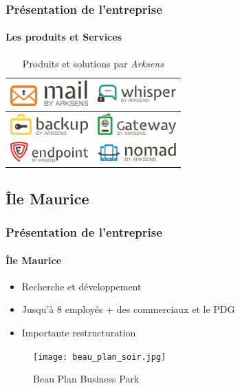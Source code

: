 \documentclass{beamer}
\begin{document}
\begin{frame}
  \frametitle{Pr\'esentation de l'entreprise}
  \framesubtitle{Les produits et Services}
  \begin{table}[h!]
    \centering
    \def\arraystretch{1.5}
    \setlength{\fboxsep}{13pt} %
    \setlength{\fboxrule}{0pt} %
    \begin{tabular}{cc}
      \arrayrulecolor{gray73}
      \includegraphics[width=3cm, fbox]{produits/mail.png} & 
      \includegraphics[width=3cm, fbox]{produits/whisper.png}\\
      \hline
      \includegraphics[width=3cm, fbox]{produits/backup.png} &
      \includegraphics[width=3cm, fbox]{produits/gateway.png}\\
      \hline
      \includegraphics[width=3cm, fbox]{produits/endpoint.png} &
      \includegraphics[width=3cm, fbox]{produits/nomad.png}\\
    \end{tabular}
    \caption{Produits et solutions par \textit{Arksens}}
  \end{table}
\end{frame}

\subsection{\^Ile Maurice}
\begin{frame}
  \frametitle{Pr\'esentation de l'entreprise}
  \framesubtitle{\^Ile Maurice}
  \begin{minipage}{0.49\linewidth}
    \begin{itemize}
     \item Recherche et d\'eveloppement
     \item Jusqu'\`a 8 employ\'es + des commerciaux et le PDG
     \item Importante restructuration
    \end{itemize}
  \end{minipage}
  \begin{minipage}{0.49\linewidth}
    \begin{figure}[h!]
      \centering
      \texttt{[image: beau\_plan\_soir.jpg]}
      \caption{Beau Plan Business Park}
    \end{figure}
  \end{minipage}
\end{frame}
\end{document}

